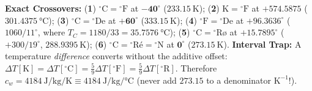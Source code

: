 \begin{quicksheet*}
\begin{trapbox}
\footnotesize
\textbf{Exact Crossovers:}
(\textbf{1}) $^\circ\mathrm{C} = {^\circ\mathrm{F}}$ at $\mathbf{-40^\circ}$ ($\SI{233.15}{\kelvin}$);
(\textbf{2}) $\mathrm{K} = {^\circ\mathrm{F}}$ at $\mathbf{+574.5875}$ ($\SI{301.4375}{\celsius}$);
(\textbf{3}) $^\circ\mathrm{C} = {^\circ\mathrm{De}}$ at $\mathbf{+60^\circ}$ ($\SI{333.15}{\kelvin}$);
(\textbf{4}) $^\circ\mathrm{F} = {^\circ\mathrm{De}}$ at $\mathbf{+96.3636^\circ}$ ($1060/11^\circ$, where $T_C = 1180/33 = \SI{35.7576}{\celsius}$);
(\textbf{5}) $^\circ\mathrm{C} = {^\circ}\text{R\o}$ at $\mathbf{+15.7895^\circ}$ ($+300/19^\circ$, $\SI{288.9395}{\kelvin}$);
(\textbf{6}) $^\circ\mathrm{C} = {^\circ}\text{R\'e} = {^\circ\mathrm{N}}$ at $\mathbf{0^\circ}$ ($\SI{273.15}{\kelvin}$).
\textbf{Interval Trap:} A temperature \emph{difference} converts without the additive offset: $\Delta T[\mathrm{K}] = \Delta T[^\circ\mathrm{C}] = \tfrac{5}{9}\Delta T[^\circ\mathrm{F}] = \tfrac{5}{9}\Delta T[^\circ\mathrm{R}]$. Therefore $c_w = \SI{4184}{\joule\per\kilogram\per\kelvin} \equiv \SI{4184}{\joule\per\kilogram\per\celsius}$ (never add $273.15$ to a denominator $\text{K}^{-1}$!).
\end{trapbox}
\end{quicksheet*}

